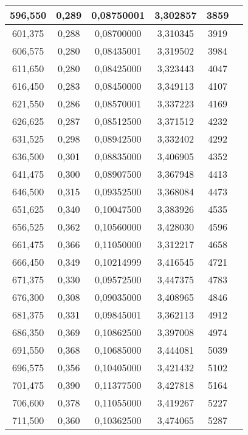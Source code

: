 \documentclass[a4paper,12pt]{article}
\numberwithin{equation}{section}
\begin{document}
\begin{appendices}
\begin{longtable}[c]{|c|c|c|c|c|c|}
596,550	&	 		0,289	&	 		0,08750001		 	&	3,302857	&	 		3859		\\\hline
601,375	&	 		0,288	&	 		0,08700000		 	&	3,310345	&	 		3919		\\\hline
606,575	&	 		0,280	&	 		0,08435001		 	&	3,319502	&	 		3984		\\\hline
611,650	&	 		0,280	&	 		0,08425000		 	&	3,323443	&	 		4047		\\\hline
616,450	&	 		0,283	&	 		0,08450000		 	&	3,349113	&	 		4107		\\\hline
621,550	&	 		0,286	&	 		0,08570001		 	&	3,337223	&	 		4169		\\\hline
626,625	&	 		0,287	&	 		0,08512500		 	&	3,371512	&	 		4232		\\\hline
631,525	&	 		0,298	&	 		0,08942500		 	&	3,332402	&	 		4292		\\\hline
636,500	&	 		0,301	&	 		0,08835000		 	&	3,406905	&	 		4352		\\\hline
641,475	&	 		0,300	&	 		0,08907500		 	&	3,367948	&	 		4413		\\\hline
646,500	&	 		0,315	&	 		0,09352500		 	&	3,368084	&	 		4473		\\\hline
651,625	&	 		0,340	&	 		0,10047500		 	&	3,383926	&	 		4535		\\\hline
656,525	&	 		0,362	&	 		0,10560000		 	&	3,428030	&	 		4596		\\\hline
661,475	&	 		0,366	&	 		0,11050000		 	&	3,312217	&	 		4658		\\\hline
666,450	&	 		0,349	&	 		0,10214999		 	&	3,416545	&	 		4721		\\\hline
671,375	&	 		0,330	&	 		0,09572500		 	&	3,447375	&	 		4783		\\\hline
676,300	&	 		0,308	&	 		0,09035000		 	&	3,408965	&	 		4846		\\\hline
681,375	&	 		0,331	&	 		0,09845001		 	&	3,362113	&	 		4912		\\\hline
686,350	&	 		0,369	&	 		0,10862500		 	&	3,397008	&	 		4974		\\\hline
691,550	&	 		0,368	&	 		0,10685000		 	&	3,444081	&	 		5039		\\\hline
696,575	&	 		0,356	&	 		0,10405000		 	&	3,421432	&	 		5102		\\\hline
701,475	&	 		0,390	&	 		0,11377500		 	&	3,427818	&	 		5164		\\\hline
706,600	&	 		0,378	&	 		0,11055000		 	&	3,419267	&	 		5227		\\\hline
711,500	&	 		0,360	&	 		0,10362500		 	&	3,474065	&	 		5287		\\\hline

\end{longtable}
\end{appendices}
\end{document}
